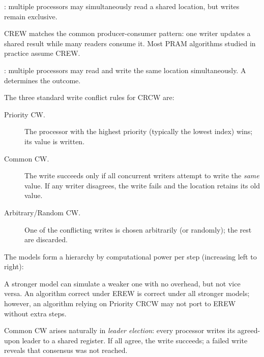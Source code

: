 \begin{ppdefn}
: multiple processors may
simultaneously read a shared location, but writes remain exclusive.
\end{ppdefn}

CREW matches the common producer-consumer pattern: one writer updates a
shared result while many readers consume it. Most PRAM algorithms studied in
practice assume CREW.

\begin{ppdefn}
: multiple processors may
read and write the same location simultaneously. A  determines the outcome.
\end{ppdefn}

The three standard write conflict rules for CRCW are:

\begin{description}
  \item[Priority CW.] The processor with the highest priority (typically the
    lowest index) wins; its value is written.
  \item[Common CW.] The write succeeds only if all concurrent writers attempt
    to write the \emph{same} value. If any writer disagrees, the write fails
    and the location retains its old value.
  \item[Arbitrary/Random CW.] One of the conflicting writes is chosen
    arbitrarily (or randomly); the rest are discarded.
\end{description}

\begin{ppnote}
The models form a hierarchy by computational power per step (increasing left to right):

\centerline{}

A stronger model can simulate a weaker one with no overhead, but not vice versa. An algorithm correct under EREW is correct under all stronger models; however, an algorithm relying on Priority CRCW may not port to EREW without extra steps.
\end{ppnote}

\begin{ppexample}
Common CW arises naturally in \emph{leader election}: every processor writes
its agreed-upon leader to a shared register. If all agree, the write succeeds;
a failed write reveals that consensus was not reached.
\end{ppexample}


